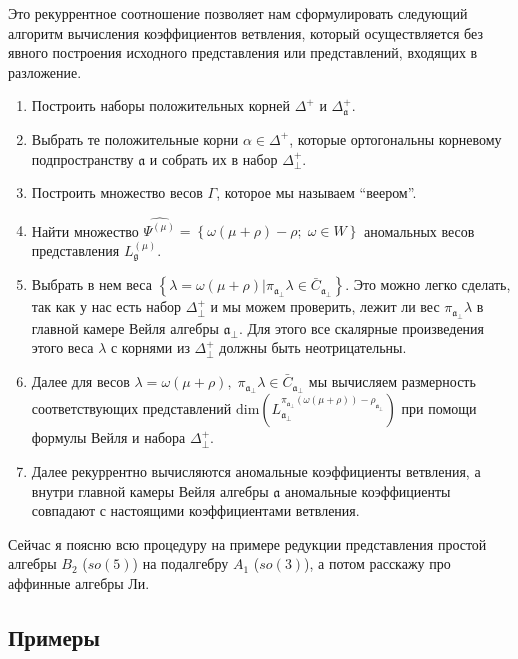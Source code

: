 \documentclass[a4paper,12pt]{article}
\theoremstyle{definition} \newtheorem{Def}{Definition}
\begin{document}
Это рекуррентное соотношение позволяет нам сформулировать следующий алгоритм вычисления
коэффициентов ветвления, который осуществляется без явного построения исходного представления или
представлений, входящих в разложение.
\begin{enumerate}
\item Построить наборы положительных корней $\Delta^{+}$ и $\Delta_{\mathfrak{a}}^{+}$.
\item Выбрать те положительные корни $\alpha\in \Delta^{+}$, которые ортогональны корневому
  подпространству  $\mathfrak{a}$ и собрать их в набор $\Delta^{+}_{\bot}$.
\item Построить множество весов $\Gamma$, которое мы называем ``веером''.
\item Найти множество $\widehat{\Psi^{(\mu)}}=\left\{\omega(\mu+\rho)-\rho;\; \omega\in W\right\}$
  аномальных весов представления $L^{(\mu)}_{\mathfrak{g}}$.
\item Выбрать в нем веса $\left\{ \lambda=\omega(\mu+\rho) | \pi_{\mathfrak{a}_{\bot}}\lambda \in
    \bar{C}_{\mathfrak{a}_{\bot}} \right\}$. Это можно легко сделать, так как у нас есть набор
  $\Delta^{+}_{\bot}$ и мы можем проверить, лежит ли вес $\pi_{\mathfrak{a}_{\bot}}\lambda$ в
  главной камере Вейля алгебры $\mathfrak{a}_{\bot}$. Для этого все скалярные произведения этого
  веса $\lambda$ с корнями из  $\Delta^{+}_{\bot}$ должны быть неотрицательны.
\item Далее для весов $\lambda=\omega(\mu+\rho),\; \pi_{\mathfrak{a}_{\bot}}\lambda\in
  \bar{C}_{\mathfrak{a}_{\bot}}$ мы вычисляем размерность соответствующих представлений
  $\mathrm{dim}\left(L^{\pi_{\mathfrak{a}_{\bot}}(\omega(\mu+\rho))-\rho_{\mathfrak{a}_{\bot}}}_{\mathfrak{a}_{\bot}}\right)$
  при помощи формулы Вейля и набора $\Delta^{+}_{\bot}$.
\item Далее рекуррентно вычисляются аномальные коэффициенты ветвления, а внутри главной камеры Вейля
  алгебры $\mathfrak{a}$ аномальные коэффициенты совпадают с настоящими коэффициентами ветвления.
\end{enumerate}

Сейчас я поясню всю процедуру на примере редукции представления простой алгебры $B_2$ ($so(5)$) на
подалгебру $A_1$ ($so(3)$), а потом расскажу про аффинные алгебры Ли.

\subsection{Примеры}
\label{sec:examples}
\end{document}
